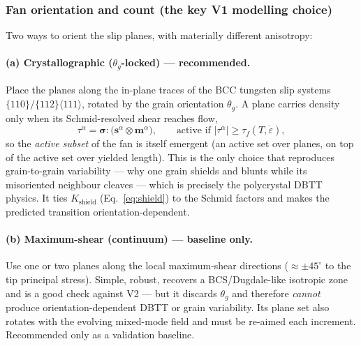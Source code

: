 \documentclass[11pt]{article}
\newcommand{\sig}{\bm{\sigma}}
\begin{document}
\subsubsection{Fan orientation and count (the key V1 modelling choice)}
\label{sec:fan}
Two ways to orient the slip planes, with materially different anisotropy:

\paragraph{(a) Crystallographic ($\theta_g$-locked) --- recommended.} Place the
planes along the in-plane traces of the BCC tungsten slip systems
$\{110\}/\{112\}\langle111\rangle$, rotated by the grain orientation $\theta_g$.
A plane carries density only when its Schmid-resolved shear reaches flow,
\begin{equation}
\tau^{\alpha}=\sig:\big(\mathbf s^{\alpha}\!\otimes\!\mathbf m^{\alpha}\big),
\qquad
\text{active if } |\tau^{\alpha}|\ge \tau_f(T,\dot\varepsilon),
\label{eq:schmid}
\end{equation}
so the \emph{active subset} of the fan is itself emergent (an active set over
planes, on top of the active set over yielded length). This is the only choice
that reproduces grain-to-grain variability --- why one grain shields and blunts
while its misoriented neighbour cleaves --- which is precisely the polycrystal
DBTT physics. It ties $K_{\mathrm{shield}}$ (Eq.~\eqref{eq:shield}) to the
Schmid factors and makes the predicted transition orientation-dependent.

\paragraph{(b) Maximum-shear (continuum) --- baseline only.} Use one or two
planes along the local maximum-shear directions ($\approx\pm45^\circ$ to the tip
principal stress). Simple, robust, recovers a BCS/Dugdale-like isotropic zone and
is a good check against V2 --- but it discards $\theta_g$ and therefore
\emph{cannot} produce orientation-dependent DBTT or grain variability. Its plane
set also rotates with the evolving mixed-mode field and must be re-aimed each
increment. Recommended only as a validation baseline.
\end{document}
